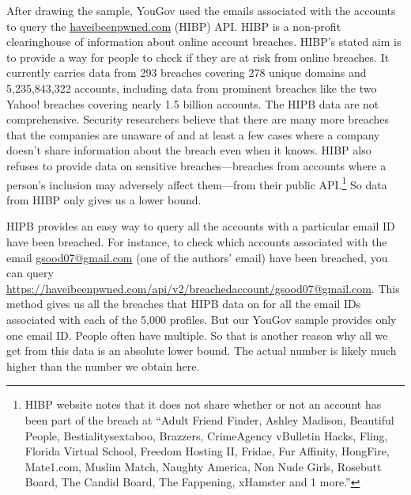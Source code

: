 \documentclass[12pt, letterpaper]{article}
\begin{document}
After drawing the sample, YouGov used the emails associated with the accounts to query the \url{haveibeenpwned.com} (HIBP) API. HIBP is a non-profit clearinghouse of information about online account breaches. HIBP's stated aim is to provide a way for people to check if they are at risk from online breaches. It currently carries data from 293 breaches covering 278 unique domains and 5,235,843,322 accounts, including data from prominent breaches like the two Yahoo! breaches covering nearly 1.5 billion accounts. The HIPB data are not comprehensive. Security researchers believe that there are many more breaches that the companies are unaware of and at least a few cases where a company doesn't share information about the breach even when it knows. HIBP also refuses to provide data on sensitive breaches---breaches from accounts where a person's inclusion may adversely affect them---from their public API.\footnote{HIBP website notes that it does not share whether or not an account has been part of the breach at ``Adult Friend Finder, Ashley Madison, Beautiful People, Bestialitysextaboo, Brazzers, CrimeAgency vBulletin Hacks, Fling, Florida Virtual School, Freedom Hosting II, Fridae, Fur Affinity, HongFire, Mate1.com, Muslim Match, Naughty America, Non Nude Girls, Rosebutt Board, The Candid Board, The Fappening, xHamster and 1 more.''} So data from HIBP only gives us a lower bound.

HIPB provides an easy way to query all the accounts with a particular email ID have been breached. For instance, to check which accounts associated with the email \url{gsood07@gmail.com} (one of the authors' email) have been breached, you can query \url{https://haveibeenpwned.com/api/v2/breachedaccount/gsood07@gmail.com}. This method gives us all the breaches that HIPB data on for all the email IDs associated with each of the 5,000 profiles. But our YouGov sample provides only one email ID. People often have multiple. So that is another reason why all we get from this data is an absolute lower bound. The actual number is likely much higher than the number we obtain here.
\end{document}
